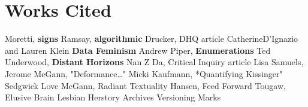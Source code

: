 \documentclass[11pt]{article}
\begin{document}
\section{Works Cited}
\label{sec:orgb967482}

Moretti, \textbf{signs} 
Ramsay, \textbf{algorithmic} 
Drucker, DHQ article 
CatherineD'Ignazio and Lauren Klein \textbf{Data Feminism} 
Andrew Piper, \textbf{Enumerations} 
Ted Underwood, \textbf{Distant Horizons} 
Nan Z Da, Critical Inquiry article 
Lisa Samuels, Jerome McGann, "Deformance\ldots{}"  
Micki Kaufmann, *Quantifying Kissinger"
Sedgwick
Love
McGann, Radiant Textuality
Hansen, Feed Forward
Tougaw, Elusive Brain
Lesbian Herstory Archives
Versioning Marks
\end{document}

